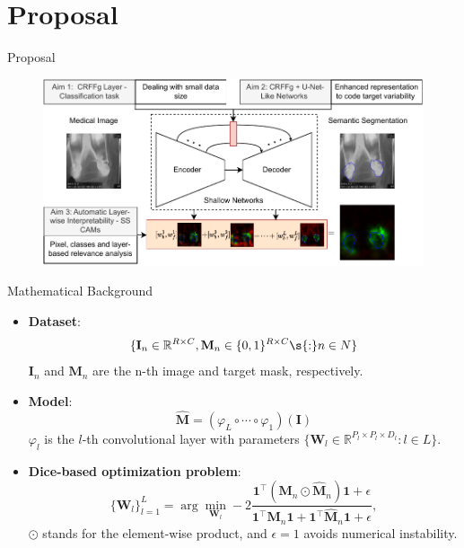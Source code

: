 \documentclass[aspectratio=169]{beamer}
\providecommand{\mat}[1]{{\bm{#1}}}
\begin{document}
\section{Proposal}

\begin{frame}{Proposal}

\begin{figure}
    \centering \includegraphics[width=0.8\linewidth]{Figures/contribution_thesis.pdf}
\end{figure}

\end{frame}

\begin{frame}{Mathematical Background}
    

\begin{itemize}
    \item \textbf{Dataset}: $$\{\mathbf{I}_n \in \mathbb{R}^{R \times C} , \mathbf{M}_n \in \{ 0, 1\} ^{R \times C} \s{:} n \in N\}$$
    $\mathbf{I}_n$ and $\mathbf{M}_n$ are the n-th image and target mask, respectively.
    \item \textbf{Model}: 
    $$\mathbf{\hat{M}} = (\varphi_L \circ \dotsb \circ \varphi_1)(\mathbf{I})$$
    $\varphi_l$ is  the $l$-th convolutional layer with parameters $\{\mathbf{W}_l \in \mathbb{R}^{P_l \times P_l \times D_l} : l \in L\}$.
    \item \textbf{Dice-based optimization problem}:
    $$
	 \{\mathbf{W}_l\}^L_{l=1} = \arg\min_{\mathbf{W}_l}
		 -2 \frac{\mat{1}^\top(\mat{M}_n \odot \mat{\hat{M}}_n)\mat{1} + \epsilon}{\mat{1}^\top \mat{M}_n\mat{1} + \mat{1}^\top\mat{\hat{M}}_n\mat{1} + \epsilon},\label{eq:opt}
    $$
    $\odot$ stands for the element-wise product, and  $\epsilon {=} 1$ avoids numerical instability.
\end{itemize}


\end{frame}

\end{document}
